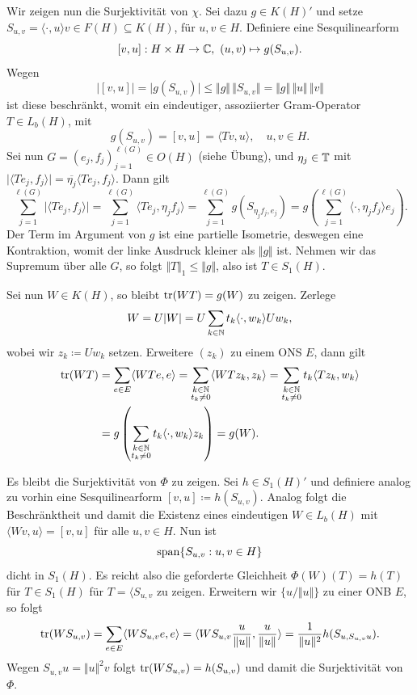 Wir zeigen nun die Surjektivität von $\chi$. Sei dazu $g \in K(H)'$ und setze $S_{u,v} = \langle \cdot, u \rangle v \in F(H) \subseteq K(H)$, für $u, v \in H$. Definiere eine Sesquilinearform
\[
    [v, u] : H \times H \to \mathbb{C}, \ (u, v) \mapsto g(S_{u,v}).
\]
Wegen
\[
    \vert [v, u] \vert
    =
    \vert g(S_{u,v}) \vert
    \leq
    \Vert g \Vert \, \Vert S_{u,v} \Vert
    =
    \Vert g \Vert \, \Vert u \Vert \, \Vert v \Vert
\]
ist diese beschränkt, womit ein eindeutiger, assoziierter Gram-Operator $T \in L_b(H)$, mit
\[
    g(S_{u,v}) = [v, u] = \langle Tv, u \rangle, \quad u, v \in H.
\]
Sei nun $G = (e_j, f_j)_{j=1}^{\ell(G)} \in O(H)$ (siehe Übung), und $\eta_j \in \mathbb{T}$ mit $\vert \langle T e_j, f_j \rangle \vert = \overline{\eta_j} \langle T e_j, f_j \rangle$. Dann gilt
\[
    \sum_{j=1}^{\ell(G)} \vert \langle T e_j, f_j \rangle \vert
    =
    \sum_{j=1}^{\ell(G)} \langle T e_j, \eta_j f_j \rangle
    =
    \sum_{j=1}^{\ell(G)} g(S_{\eta_j f_j, e_j})
    =
    g \left( \sum_{j=1}^{\ell(G)} \langle \cdot, \eta_j f_j \rangle e_j \right).
\]
Der Term im Argument von $g$ ist eine partielle Isometrie, deswegen eine Kontraktion, womit der linke Ausdruck kleiner als $\Vert g \Vert$ ist. Nehmen wir das Supremum über alle $G$, so folgt $\Vert T \Vert_1 \leq \Vert g \Vert$, also ist $T \in S_1(H)$.

Sei nun $W \in K(H)$, so bleibt $\operatorname*{tr}(WT) = g(W)$ zu zeigen. Zerlege
\[
    W = U \vert W \vert = U \sum_{k \in \mathbb{N}} t_k \langle \cdot, w_k \rangle U w_k,
\]
wobei wir $z_k \coloneqq U w_k$ setzen. Erweitere $(z_k)$ zu einem ONS $E$, dann gilt
\begin{align*}
    \operatorname*{tr}(WT)
    &=
    \sum_{e \in E} \langle WT e, e \rangle
    =
    \sum_{\substack{k \in \mathbb{N} \\ t_k \neq 0}} \langle WT z_k, z_k \rangle
    =
    \sum_{\substack{k \in \mathbb{N} \\ t_k \neq 0}} t_k \langle T z_k, w_k \rangle
    \\
    &=
    g \left( \sum_{\substack{k \in \mathbb{N} \\ t_k \neq 0}} t_k \langle \cdot, w_k \rangle z_k \right)
    =
    g(W).
\end{align*}

Es bleibt die Surjektivität von $\Phi$ zu zeigen. Sei $h \in S_1(H)'$ und definiere analog zu vorhin eine Sesquilinearform $[v,u] \coloneqq h(S_{u,v})$. Analog folgt die Beschränktheit und damit die Existenz eines eindeutigen $W \in L_b(H)$ mit $\langle Wv, u \rangle = [v,u]$ für alle $u, v \in H$. Nun ist
\[
    \mathrm{span} \{ S_{u,v} : u, v \in H \}
\]
dicht in $S_1(H)$. Es reicht also die geforderte Gleichheit $\Phi(W)(T) = h(T)$ für $T \in S_1(H)$ für $T = \langle S_{u,v}$ zu zeigen. Erweitern wir $\{ u / \Vert u \Vert \}$ zu einer ONB $E$, so folgt
\[
    \operatorname*{tr}(W S_{u,v})
    =
    \sum_{e \in E} \langle W S_{u,v} e, e \rangle
    =
    \langle W S_{u,v} \frac{u}{\Vert u \Vert}, \frac{u}{\Vert u \Vert} \rangle
    =
    \frac{1}{\Vert u \Vert^2} h(S_{u, S_{u,v} u}).
\]
Wegen $S_{u,v} u = \Vert u \Vert^2 v$ folgt $\operatorname*{tr} (W S_{u,v}) = h(S_{u,v})$ und damit die Surjektivität von $\Phi$.